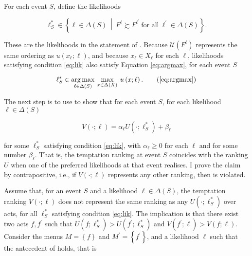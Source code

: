 For each event \( S \), define the likelihoods

\begin{equation}\label{eq:lik}
	\ell^{*}_S \in \left\{ \ell \in \Delta \left( S \right) \: \middle\vert \: F^{\ell} \succsim F^{\ell^{\prime}} \: \text{for all} \: \ell^{\prime} \in \Delta \left( S \right)  \right\} .
\end{equation}

These are the likelihoods in the statement of . Because \( \mathscr{U} \left( F^{\ell} \right) \) represents the same ordering as \( u \left( x_{\ell}; \ell \right) \), and because \( x_{\ell} \in X_{\ell} \) for each \( \ell \), likelihoods satisfying condition \eqref{eq:lik} also satisfy Equation \eqref{eq:argmax}, for each event \( S \)

\begin{equation}
	\ell^{*}_{S} \in \underset{\ell \in \Delta \left( S \right)}{\arg \max} \: \max_{x \in \Delta \left( X \right)} \: u \left( x ; \ell \right) .
	\tag{\ref{eq:argmax}} %
\end{equation}

The next step is to use  to show that for each event \( S \), for each likelihood \( \ell \in \Delta \left( S \right) \)

\begin{equation}
	\label{eq:affine}
	V \left(\cdot ; \ell \right) = \alpha_{\ell} U \left( \cdot ; \ell^{*}_{S} \right) + \beta_{\ell}
\end{equation}

for some \( \ell^{*}_{S} \) satisfying condition \eqref{eq:lik}, with \( \alpha_{\ell} \geq 0 \) for each \( \ell \) and for some number \( \beta_{\ell} \). That is, the temptation ranking at event \( S \) coincides with the ranking \( U \) when one of the preferred likelihoods at that event realises. I prove the claim by contrapositive, i.e., if \( V \left( \cdot ; \ell \right) \) represents any other ranking, then  is violated.

Assume that, for an event \( S \) and a likelihood \( \ell \in \Delta \left( S \right) \), the temptation ranking \( V \left( \cdot ; \ell \right) \) does not represent the same ranking as any \( U \left( \cdot ; \ell^{*}_{S} \right) \) over acts, for all \( \ell^{*}_{S} \) satisfying condition \eqref{eq:lik}. The implication is that there exist two acts \( f, f^{\prime} \) such that \( U \left( f; \ell^{*}_{S} \right) > U \left( f^{\prime}; \ell^{*}_{S} \right) \) and \( V \left( f^{\prime}; \ell \right) > V \left( f ; \ell \right) \). Consider the menus \( M = \left\{ f \right\} \) and \( M^{\prime} = \left\{ f^{\prime} \right\} \), and a likelihood \( \ell \) such that the antecedent of  holds, that is

